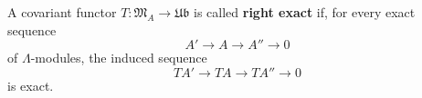 A covariant functor $T : \mathfrak{M}_A \rightarrow \mathfrak{Ub}$ is called \textbf{right exact} if, for every exact sequence
$$A' \rightarrow A \rightarrow A'' \rightarrow 0$$
of $\Lambda$-modules, the induced sequence
$$TA' \rightarrow TA \rightarrow TA'' \rightarrow 0$$
is exact.
